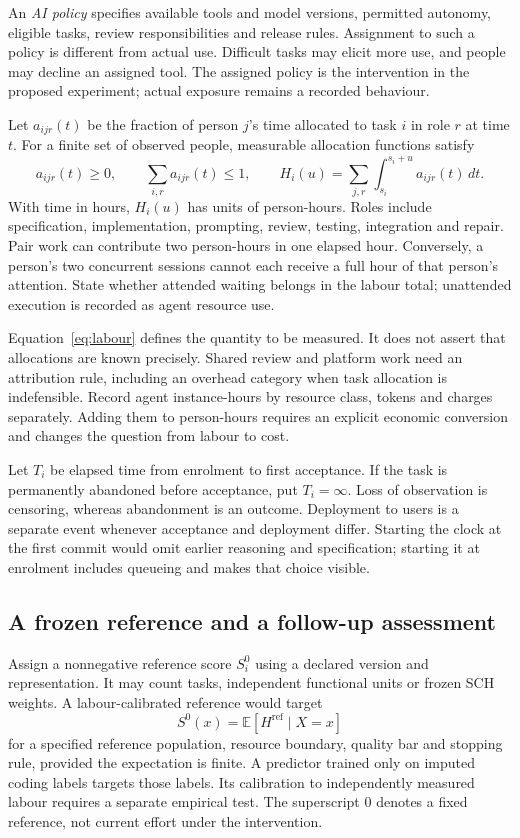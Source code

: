 \documentclass[11pt,a4paper]{amsart}
\theoremstyle{definition}
\theoremstyle{remark}
\newcommand{\E}{\mathbb E}
\begin{document}
An \emph{AI policy} specifies available tools and model versions, permitted autonomy, eligible tasks, review responsibilities and release rules. Assignment to such a policy is different from actual use. Difficult tasks may elicit more use, and people may decline an assigned tool. The assigned policy is the intervention in the proposed experiment; actual exposure remains a recorded behaviour.

Let $a_{ijr}(t)$ be the fraction of person $j$'s time allocated to task $i$ in role $r$ at time $t$. For a finite set of observed people, measurable allocation functions satisfy
\begin{equation}
\label{eq:labour}
 a_{ijr}(t)\geq0,\qquad \sum_{i,r}a_{ijr}(t)\leq1,\qquad
 H_i(u)=\sum_{j,r}\int_{s_i}^{s_i+u}a_{ijr}(t)\,dt.
\end{equation}
With time in hours, $H_i(u)$ has units of person-hours. Roles include specification, implementation, prompting, review, testing, integration and repair. Pair work can contribute two person-hours in one elapsed hour. Conversely, a person's two concurrent sessions cannot each receive a full hour of that person's attention. State whether attended waiting belongs in the labour total; unattended execution is recorded as agent resource use.

Equation~\eqref{eq:labour} defines the quantity to be measured. It does not assert that allocations are known precisely. Shared review and platform work need an attribution rule, including an overhead category when task allocation is indefensible. Record agent instance-hours by resource class, tokens and charges separately. Adding them to person-hours requires an explicit economic conversion and changes the question from labour to cost.

Let $T_i$ be elapsed time from enrolment to first acceptance. If the task is permanently abandoned before acceptance, put $T_i=\infty$. Loss of observation is censoring, whereas abandonment is an outcome. Deployment to users is a separate event whenever acceptance and deployment differ. Starting the clock at the first commit would omit earlier reasoning and specification; starting it at enrolment includes queueing and makes that choice visible.

\subsection{A frozen reference and a follow-up assessment}

Assign a nonnegative reference score $S_i^0$ using a declared version and representation. It may count tasks, independent functional units or frozen SCH weights. A labour-calibrated reference would target
\begin{equation}
\label{eq:reference}
 S^0(x)=\E[H^{\mathrm{ref}}\mid X=x]
\end{equation}
for a specified reference population, resource boundary, quality bar and stopping rule, provided the expectation is finite. A predictor trained only on imputed coding labels targets those labels. Its calibration to independently measured labour requires a separate empirical test. The superscript $0$ denotes a fixed reference, not current effort under the intervention.
\end{document}
